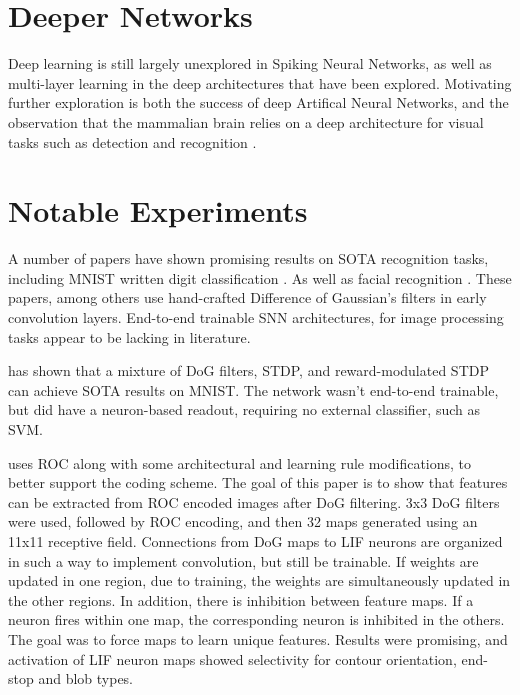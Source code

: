     \section{Deeper Networks}
    Deep learning is still largely unexplored in Spiking Neural Networks, as
    well as multi-layer learning in the deep architectures that have been
    explored. Motivating further exploration is both the success of deep
    Artifical Neural Networks, and the observation that the mammalian brain
    relies on a deep architecture for visual tasks such as detection and
    recognition \cite{tavanaei_2019}.
    
    \section{Notable Experiments}
    A number of papers have shown promising results on SOTA recognition tasks,
    including MNIST written digit classification \cite{mozafari_2018}. As well as
    facial recognition \cite{delorme_2001}. These papers, among others use
    hand-crafted Difference of Gaussian's filters in early convolution
    layers. End-to-end trainable SNN architectures, for image processing tasks
    appear to be lacking in literature.
    
    \cite{mozafari_2018} has shown that a mixture of DoG filters, STDP, and
    reward-modulated STDP can achieve SOTA results on MNIST. The network wasn't
    end-to-end trainable, but did have a neuron-based readout, requiring no
    external classifier, such as SVM.
    
    \cite{delorme_2001} uses ROC along with some architectural and learning rule
    modifications, to better support the coding scheme. The goal of this paper
    is to show that features can be extracted from ROC encoded images after DoG
    filtering. 3x3 DoG filters were used, followed by ROC encoding, and then 32
    maps generated using an 11x11 receptive field. Connections from DoG maps to
    LIF neurons are organized in such a way to implement convolution, but still
    be trainable. If weights are updated in one region, due to training, the
    weights are simultaneously updated in the other regions. In addition, there
    is inhibition between feature maps. If a neuron fires within one map, the
    corresponding neuron is inhibited in the others. The goal was to force maps
    to learn unique features. Results were promising, and activation of LIF
    neuron maps showed selectivity for contour orientation, end-stop and blob
    types.
    
